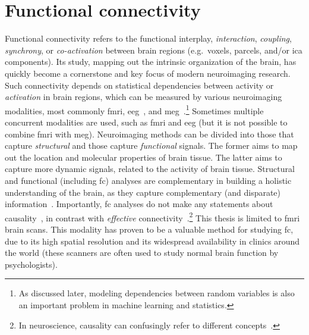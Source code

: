 \clearpage
\section{Functional connectivity}

Functional connectivity refers to the functional interplay, \emph{interaction}, \emph{coupling}, \emph{synchrony}, or \emph{co-activation} between brain regions (e.g.~voxels, parcels, and/or \gls{ica} components).
Its study, mapping out the intrinsic organization of the brain, has quickly become a cornerstone and key focus of modern neuroimaging research.
Such connectivity depends on statistical dependencies between activity or \emph{activation} in brain regions, which can be measured by various neuroimaging modalities, most commonly \gls{fmri}, \gls{eeg}~\parencite[e.g.][]{Tagliazucchi2012, Chang2013}, and \gls{meg}~\parencite[e.g.][]{Baker2014, Vidaurre2018}.\footnote{As discussed later, modeling dependencies between random variables is also an important problem in machine learning and statistics.}
Sometimes multiple concurrent modalities are used, such as \gls{fmri} and \gls{eeg} (but it is not possible to combine \gls{fmri} with \gls{meg}).
%
Neuroimaging methods can be divided into those that capture \emph{structural} and those capture \emph{functional} signals.
The former aims to map out the location and molecular properties of brain tissue.
The latter aims to capture more dynamic signals, related to the activity of brain tissue.
Structural and functional (including \gls{fc}) analyses are complementary in building a holistic understanding of the brain, as they capture complementary (and disparate) information~\parencite{Lang2012}.
Importantly, \gls{fc} analyses do not make any statements about causality~\parencite{Mehler2018}, in contrast with \emph{effective} connectivity~\parencite{Friston2011, Smith2012b, Park2018, Zeidman2019, Zarghami2020}.\footnote{In neuroscience, causality can confusingly refer to different concepts~\parencite[see][]{Barack2022}.}
%
This thesis is limited to \gls{fmri} brain scans.
This modality has proven to be a valuable method for studying \gls{fc}, due to its high spatial resolution and its widespread availability in clinics around the world (these scanners are often used to study normal brain function by psychologists).

